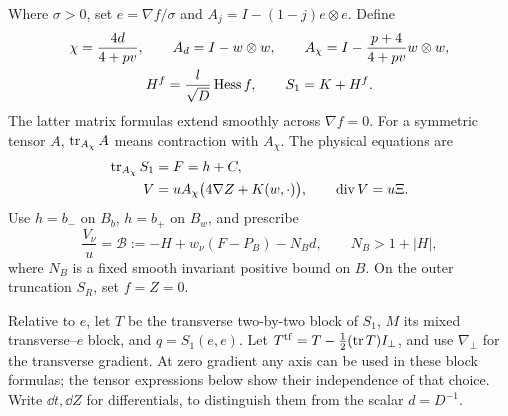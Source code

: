 Where $\sigma>0$, set $e=\nabla f/\sigma$ and
$A_j=I-(1-j)e\otimes e$.  Define
\begin{equation}\label{d:ellipticity}
 \begin{gathered}
 \chi=\frac{4d}{4+pv},\qquad
 A_d=I-w\otimes w,\qquad
 A_\chi=I-\frac{p+4}{4+pv}w\otimes w,\\
 H^f=\frac l{\sqrt D}\operatorname{Hess} f,\qquad S_1=K+H^f.
 \end{gathered}
\end{equation}
The latter matrix formulas extend smoothly across $\nabla f=0$.
For a symmetric tensor $A$, $\operatorname{tr}_{A_\chi}A$ means contraction with
$A_\chi$.  The physical equations are
\begin{align}
 \operatorname{tr}_{A_\chi}S_1&=F=h+C,\label{d:trace}\\
 V&=uA_\chi\bigl(4\nabla Z+K(w,\cdot)\bigr),\qquad
 \operatorname{div} V=u\Xi.\label{d:divergence}
\end{align}
Use $h=b_-$ on $B_b$, $h=b_+$ on $B_w$, and prescribe
\begin{equation}\label{d:boundary}
 \frac{V_\nu}{u}=\mathcal B:=-H+w_\nu(F-P_B)-N_Bd,\qquad
 N_B>1+|H|,
\end{equation}
where $N_B$ is a fixed smooth invariant positive bound on $B$.
On the outer truncation $S_R$, set $f=Z=0$.

Relative to $e$, let $T$ be the transverse two-by-two block of $S_1$,
$M$ its mixed transverse--$e$ block, and $q=S_1(e,e)$.  Let
$T^{\rm tf}=T-\frac12(\operatorname{tr} T)I_\perp$, and use $\nabla_\perp$ for
the transverse gradient.  At zero gradient any axis can be used in
these block formulas; the tensor expressions below show their
independence of that choice.  Write $\dd t,\dd Z$ for differentials,
to distinguish them from the scalar $d=D^{-1}$.

